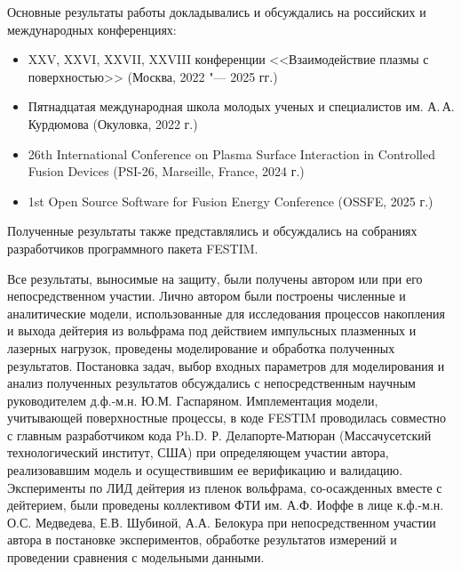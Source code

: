 {\probation}
Основные результаты работы докладывались и обсуждались на российских и международных конференциях:
\begin{itemize}
    \item XXV, XXVI, XXVII, XXVIII конференции <<Взаимодействие плазмы с поверхностью>> (Москва, 2022 "--- 2025 гг.)
    \item Пятнадцатая международная школа молодых ученых и специалистов им. А.\,А. Курдюмова (Окуловка, 2022 г.)
    \item 26th International Conference on Plasma Surface Interaction in Controlled Fusion Devices (PSI-26, Marseille, France, 2024 г.)
    \item 1st Open Source Software for Fusion Energy Conference (OSSFE, 2025 г.)
\end{itemize}
Полученные результаты также представлялись и обсуждались на собраниях разработчиков программного пакета FESTIM. 

{\contribution} Все результаты, выносимые на защиту, были получены автором или при его непосредственном участии. Лично автором были построены численные и аналитические модели, использованные для исследования процессов накопления и выхода дейтерия из вольфрама под действием импульсных плазменных и лазерных нагрузок, проведены моделирование и обработка полученных результатов. Постановка задач, выбор входных параметров для моделирования и анализ полученных результатов обсуждались с непосредственным научным руководителем д.ф.-м.н. Ю.М. Гаспаряном. Имплементация модели, учитывающей поверхностные процессы, в коде FESTIM проводилась совместно с главным разработчиком кода Ph.D. Р. Делапорте-Матюран (Массачусетский технологический институт, США) при определяющем участии автора, реализовавшим модель и осуществившим ее верификацию и валидацию. Эксперименты по ЛИД дейтерия из пленок вольфрама, со-осажденных вместе с дейтерием, были проведены коллективом ФТИ им. А.Ф. Иоффе в лице к.ф.-м.н. О.С. Медведева, Е.В. Шубиной, А.А. Белокура при непосредственном участии автора в постановке экспериментов, обработке результатов измерений и проведении сравнения с модельными данными.

